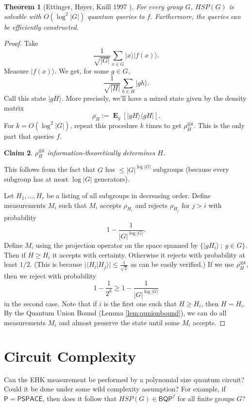 \documentclass[12pt]{report}
\theoremstyle{plain}
\newtheorem{theorem}{Theorem}[section]
\newtheorem{claim}[theorem]{Claim}
\theoremstyle{definition}
\DeclareMathOperator{\Exp}{\mathbf{E}}
\renewcommand{\ket}[1]{|#1\rangle}
\newcommand{\braket}[2]{\langle#1|#2\rangle}
\newcommand{\ketbra}[2]{|#1\rangle\!\langle#2|}
\begin{document}
\begin{theorem}[Ettinger, H\o yer, Knill 1997 \cite{ehk}]
\label{ehkthm}
For every group $G$, $HSP(G)$ is solvable with $O(\log^2|G|)$ quantum queries to $f$. Furthermore, the queries can be efficiently constructed.
\end{theorem}
\begin{proof}
Take
\[
\frac 1{\sqrt{|G|}} \sum_{x\in G}\ket{x}\ket{f(x)}.
\]
Measure $\ket{f(x)}$. We get, for some $g\in G$,
\[
\frac 1{\sqrt{|H|}} \sum_{h\in H}\ket{gh} .
\]
Call this state $\ket{gH}$. More precisely, we'll have a mixed state given by the density matrix
\[
\rho_H:=\Exp_g{[\ketbra{gH}{gH}]}.
\]
For $k=O(\log^2|G|)$, repeat this procedure $k$ times to get $\rho_H^{\otimes k}$. This is the only part that queries $f$.

\begin{claim}
$\rho_H^{\otimes k}$ information-theoretically determines $H$.
\end{claim}
This follows from the fact that $G$ has $\leq |G|^{\log|G|}$ subgroups (because every subgroup has at most $\log|G|$ generators).

\bigskip
Let  $H_1,\dots,H_r$ be a listing of all subgroups in decreasing order. Define measurements $M_i$ such that $M_i$ accepts $\rho_{H_i}$ and rejects $\rho_{H_j}$ for $j>i$ with probability
\[
1-\frac{1}{|G|^{\log|G|}}.
\]
Define $M_i$ using the projection operator on the space spanned by $\{\ket{gH_i}\ ;\ g\in G\}$. Then if $H\geq H_i$ it accepts with certainty. Otherwise it rejects with probability at least $1/2$. (This is because $|\braket{H_i}{H_j}|\le \frac{1}{\sqrt{2}}$ as can be easily verified.) If we use $\rho_H^{\otimes k}$, then we reject with probability
$$1-\frac 1{2^k}\geq 1-\frac{1}{|G|^{\log|G|}}$$
in the second case. Note that if $i$ is the first one such that $H\geq H_i$, then $H=H_i$.
By the Quantum Union Bound (Lemma \ref{lem:qunionbound}), we can do all measurements $M_i$ and almost preserve the state until some $M_i$ accepts.
\end{proof}

\section{Circuit Complexity}

Can the EHK measurement be performed by a polynomial size quantum circuit? Could it be done under some wild complexity assumption? For example, if $\mathsf{P}=\mathsf{PSPACE}$, then does it follow that $HSP(G) \in \mathsf{BQP}^f$ for all finite groups $G$?
\end{document}
